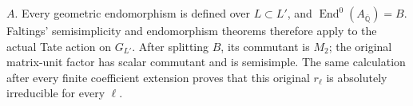 $A$. Every geometric endomorphism is defined over $L\subset L'$, and
$\operatorname{End}^0(A_{\overline{\mathbb Q}})=B$. Faltings'
semisimplicity and endomorphism theorems therefore apply to the actual
Tate action on $G_{L'}$. After splitting $B$, its commutant is $M_2$;
the original matrix-unit factor has scalar commutant and is semisimple.
The same calculation after every finite coefficient extension proves
that this original $r_\ell$ is absolutely irreducible for every $\ell$.
